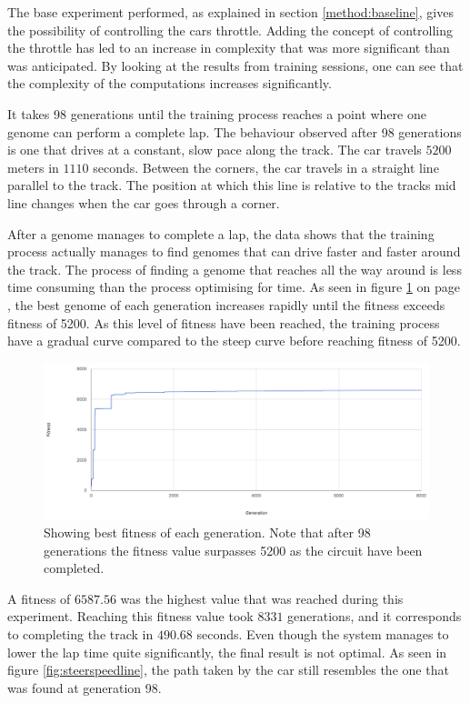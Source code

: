 The base experiment performed, as explained in section \ref{method:baseline}, gives the possibility of controlling the cars throttle. Adding the concept of controlling the throttle has led to an increase in complexity that was more significant than was anticipated. By looking at the results from training sessions, one can see that the complexity of the computations increases significantly.

It takes 98 generations until the training process reaches a point where one genome can perform a complete lap. The behaviour observed after 98 generations is one that drives at a constant, slow pace along the track. The car travels $5200$ meters in $1110$ seconds. Between the corners, the car travels in a straight line parallel to the track. The position at which this line is relative to the tracks mid line changes when the car goes through a corner.

After a genome manages to complete a lap, the data shows that the training process actually manages to find genomes that can drive faster and faster around the track. The process of finding a genome that reaches all the way around is less time consuming than the process optimising for time. As seen in figure \ref{fig:steerspeeddata} on page \pageref{fig:steerspeeddata}, the best genome of each generation increases rapidly until the fitness exceeds fitness of 5200. As this level of fitness have been reached, the training process have a gradual curve compared to the steep curve before reaching fitness of 5200.

\begin{figure}[h]
\includegraphics[width=\textwidth]{report/images/graphs/steeringandspeedcontrolrun1}
\centering
\caption{Showing best fitness of each generation. Note that after 98 generations the fitness value surpasses 5200 as the circuit have been completed.}
\label{fig:steerspeeddata}
\end{figure}

A fitness of $6587.56$ was the highest value that was reached during this experiment. Reaching this fitness value took $8331$ generations, and it corresponds to completing the track in $490.68$ seconds. Even though the system manages to lower the lap time quite significantly, the final result is not optimal. As seen in figure \ref{fig:steerspeedline}, the path taken by the car still resembles the one that was found at generation 98.

